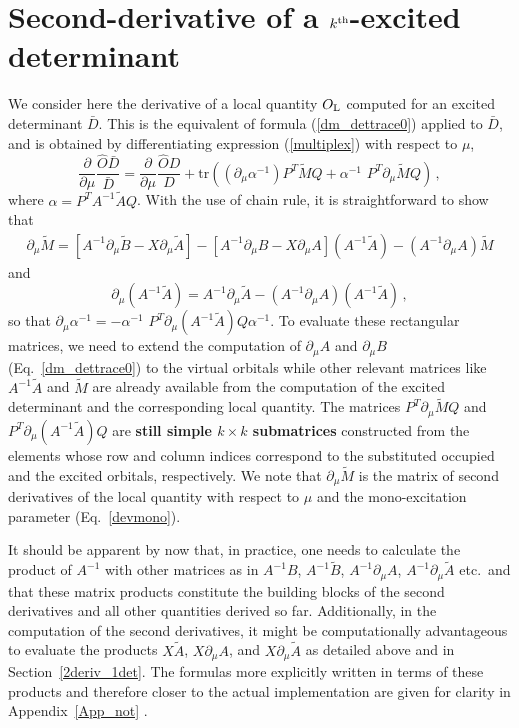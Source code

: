 \documentclass[aip,jcp,reprint,floatfix,onecolumn]{revtex4-1}
\def\tr{\text{tr}}
\def\A{A}
\begin{document}
\section{Second-derivative of a $k^{\rm th}$-excited determinant}
\label{Sec_2nd_mult}

We consider here the derivative of a local quantity $O_{\rm L}$ computed for an excited determinant $\bar{D}$. This is the equivalent of formula (\ref{dm_dettrace0}) applied to $\bar{D}$, and is obtained by differentiating expression (\ref{multiplex}) with respect to $\mu$,
\begin{equation}
\frac{\partial}{\partial \mu} \frac{\hat{O} \bar{D}}{\bar{D}} =\frac{\partial}{\partial \mu} \frac{\hat{O} D}{D} +
\tr \left((\partial_\mu  \alpha^{-1}) P^T \tilde{M} Q + \alpha^{-1} \, \, {P^T} \partial_\mu \tilde{M}Q \right)\,,
\label{der2excit}
\end{equation}
where $\alpha =  P^T\A^{-1}\tilde{\A}Q$. With the use of chain rule, it is straightforward to show that
\begin{eqnarray}
\partial_\mu \tilde{M} = [A^{-1} \partial_\mu \tilde{B} -X \partial_\mu \tilde{A}]-[A^{-1} \partial_\mu B -X \partial_\mu A](A^{-1}\tilde{A}) -(A^{-1}\partial_\mu A) \tilde{M}
\label{tildemudef}
\end{eqnarray}
and
\begin{equation}
\partial_\mu  (A^{-1}\tilde{A})  = A^{-1}\partial_\mu\tilde{A}- (A^{-1}\partial_\mu A)(\A^{-1}\tilde{A})\,,
\end{equation}
so that $\partial_\mu  \alpha^{-1} = -\alpha^{-1} \, \, P^T \partial_\mu  (A^{-1}\tilde{A})Q\alpha^{-1}$.
To evaluate these rectangular matrices, we need to extend the computation of $\partial_\mu A$ and $\partial_\mu B$ (Eq.~\ref{dm_dettrace0}) to the virtual orbitals while
other relevant matrices like $A^{-1}\tilde{A}$ and $\tilde{M}$ are already available from the computation of the excited determinant and the corresponding local quantity.
The matrices $P^T\partial_\mu \tilde{M} Q$ and $P^T\partial_\mu  (A^{-1}\tilde{A})Q$ are %
{\bf still simple $k\times k$ submatrices} constructed from the elements whose row and column indices correspond to the substituted occupied and the excited orbitals, respectively.
We note that $\partial_\mu \tilde{M}$ is the matrix of second derivatives of the local quantity with respect to $\mu$ and the mono-excitation parameter (Eq.~\ref{devmono}).

It should be apparent by now that, in practice, one needs to calculate the product of $A^{-1}$ with other matrices as in $A^{-1}B$, $A^{-1}\tilde{B}$, $A^{-1}\partial_\mu A$, $A^{-1}\partial_\mu \tilde{A}$ etc.\ and that these matrix products constitute the building blocks of the second derivatives and all other quantities derived so far. Additionally, in the computation of the second derivatives, it might be computationally advantageous to evaluate the products $X\tilde{A}$, $X\partial_\mu A$, and $X\partial_\mu \tilde{A}$ as detailed above and in Section~\ref{2deriv_1det}. The formulas more explicitly written in terms of these products and therefore closer to the actual implementation are given for clarity in Appendix~\ref{App_not} .
\end{document}
